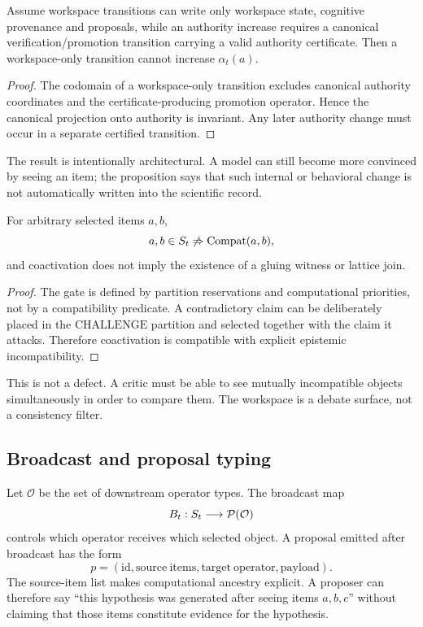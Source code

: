 \begin{proposition}
Assume workspace transitions can write only workspace state, cognitive provenance and proposals, while an authority increase requires a canonical verification/promotion transition carrying a valid authority certificate. Then a workspace-only transition cannot increase \(\alpha_t(a)\).
\end{proposition}

\begin{proof}
The codomain of a workspace-only transition excludes canonical authority coordinates and the certificate-producing promotion operator. Hence the canonical projection onto authority is invariant. Any later authority change must occur in a separate certified transition.
\end{proof}

The result is intentionally architectural. A model can still become more convinced by seeing an item; the proposition says that such internal or behavioral change is not automatically written into the scientific record.

\begin{proposition}
For arbitrary selected items \(a,b\),
\[
a,b\in S_t\not\Rightarrow \operatorname{Compat}(a,b),
\]
and coactivation does not imply the existence of a gluing witness or lattice join.
\end{proposition}

\begin{proof}
The gate is defined by partition reservations and computational priorities, not by a compatibility predicate. A contradictory claim can be deliberately placed in the \(\mathrm{CHALLENGE}\) partition and selected together with the claim it attacks. Therefore coactivation is compatible with explicit epistemic incompatibility.
\end{proof}

This is not a defect. A critic must be able to see mutually incompatible objects simultaneously in order to compare them. The workspace is a debate surface, not a consistency filter.

\subsection{Broadcast and proposal typing}

Let \(\mathcal O\) be the set of downstream operator types. The broadcast map
\[
B_t:S_t\longrightarrow\mathcal P(\mathcal O)
\]
controls which operator receives which selected object. A proposal emitted after broadcast has the form
\[
p=(\mathrm{id},\mathrm{source\ items},\mathrm{target\ operator},\mathrm{payload}).
\]
The source-item list makes computational ancestry explicit. A proposer can therefore say ``this hypothesis was generated after seeing items \(a,b,c\)'' without claiming that those items constitute evidence for the hypothesis.

